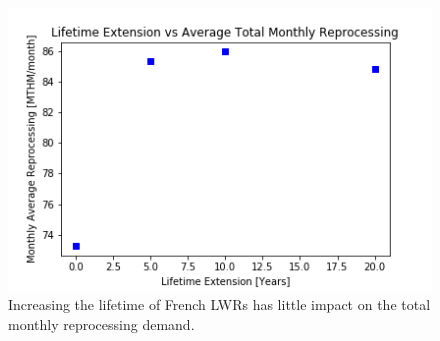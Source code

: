 \begin{figure}[htbp!]
    \begin{center}
        \includegraphics[scale=0.6]{./images/sensitivity/ext_all.png}
    \end{center}
    \caption{Increasing the lifetime of French \glspl{LWR} has little impact on the total monthly
             reprocessing demand.}
    \label{fig:ext_all}
\end{figure}


